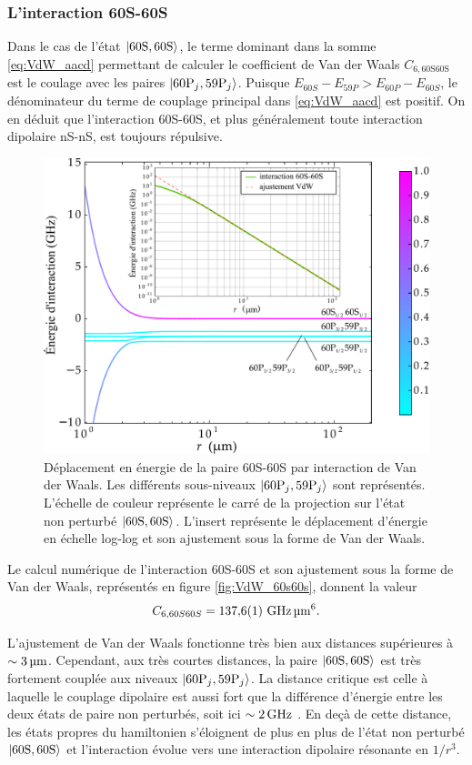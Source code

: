 \subsubsection*{L'interaction 60S-60S}
Dans le cas de l'état $\ket{60\text{S},60\text{S}}$, le terme dominant dans la somme \eqref{eq:VdW_aacd} permettant de calculer le coefficient de Van der Waals $C_{6,\text{60S60S}}$ est le coulage avec les paires $\ket{60\text{P}_j,59\text{P}_j}$.
Puisque $E_{60S}-E_{59P}>E_{60P}-E_{60S}$, le dénominateur du terme de couplage principal dans \eqref{eq:VdW_aacd} est positif.
On en déduit que l'interaction 60S-60S, et plus généralement toute interaction dipolaire nS-nS, est toujours répulsive.
%
\begin{figure}[!h]
\centering
\includegraphics[width=0.8\linewidth]{figures/theory/VdW_60S60S}
\caption[Interaction dipolaire 60S-60S]{Déplacement en énergie de la paire 60S-60S par interaction de Van der Waals. Les différents sous-niveaux $\ket{60\text{P}_j,59\text{P}_j}$ sont représentés. L'échelle de couleur représente le carré de la projection sur l'état non perturbé $\ket{60\text{S},60\text{S}}$.
L'insert représente le déplacement d'énergie en échelle log-log et son ajustement sous la forme de Van der Waals.}
\label{fig:VdW_60s60s}
\end{figure}
%
Le calcul numérique de l'interaction 60S-60S et son ajustement sous la forme de Van der Waals, représentés en figure \eqref{fig:VdW_60s60s}, donnent la valeur
\begin{equation}
\label{eq:C660S}
C_{6,60S60S} = \numv{137.6(1)}\si{\giga\hertz\raiseto{6}\micro\meter}.
\end{equation}

L'ajustement de Van der Waals fonctionne très bien aux distances supérieures à $\sim\SIvv{3}{ \micro\meter}$.
Cependant, aux très courtes distances, la paire $\ket{60\text{S},60\text{S}}$ est très fortement couplée aux niveaux $\ket{60\text{P}_j,59\text{P}_j}$.
La distance critique est celle à laquelle le couplage dipolaire est aussi fort que la différence d'énergie entre les deux états de paire non perturbés, soit ici $\sim \SIv{2}{\giga\hertz}$.
En deçà de cette distance, les états propres du hamiltonien s'éloignent de plus en plus de l'état non perturbé $\ket{60\text{S},60\text{S}}$ et l'interaction évolue vers une interaction dipolaire résonante en $1/r^3$.

